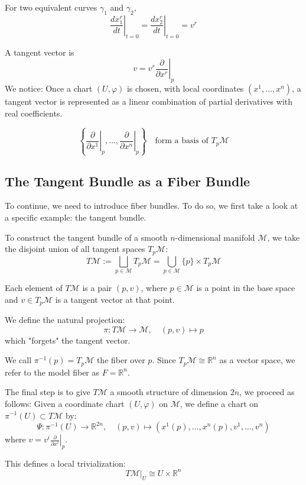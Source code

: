 For two equivalent curves $\gamma_1$ and $\gamma_2$,
\[
\left. \frac{d x_1^r}{dt} \right|_{t=0}
= \left. \frac{d x_2^r}{dt} \right|_{t=0}
= v^r
\]

A tangent vector is
\[
v = v^r \left. \frac{\partial}{\partial x^r} \right|_p
\]
We notice: Once a chart $(U, \varphi)$ is chosen, with local coordinates $(x^1, \dots, x^n)$, a tangent vector is represented as a linear combination of partial derivatives with real coefficients.

\[
\left\{ \left. \frac{\partial}{\partial x^1} \right|_p, \dots, \left. \frac{\partial}{\partial x^n} \right|_p \right\} \quad \text{form a basis of } T_p \mathcal{M}
\]



\subsection*{The Tangent Bundle as a Fiber Bundle}

To continue, we need to introduce fiber bundles. To do so, we first take a look at a specific example: the tangent bundle.

To construct the tangent bundle of a smooth $n$-dimensional manifold $\mathcal{M}$, we take the disjoint union of all tangent spaces $T_p\mathcal{M}$:
\[
T\mathcal{M} := \bigsqcup_{p \in \mathcal{M}} T_p\mathcal{M}
= \bigcup_{p \in \mathcal{M}} \{p\} \times T_p\mathcal{M}
\]

Each element of $T\mathcal{M}$ is a pair $(p, v)$, where $p \in \mathcal{M}$ is a point in the base space and $v \in T_p\mathcal{M}$ is a tangent vector at that point.

We define the natural projection:
\[
\pi: T\mathcal{M} \to \mathcal{M}, \quad (p, v) \mapsto p
\]
which "forgets" the tangent vector.

We call $\pi^{-1}(p) = T_p\mathcal{M}$ the fiber over $p$. Since $T_p\mathcal{M} \cong \mathbb{R}^n$ as a vector space, we refer to the model fiber as $F = \mathbb{R}^n$.

The final step is to give $T\mathcal{M}$ a smooth structure of dimension $2n$, we proceed as follows:  
Given a coordinate chart $(U, \varphi)$ on $\mathcal{M}$, we define a chart on $\pi^{-1}(U) \subset T\mathcal{M}$ by:
\[
\Psi: \pi^{-1}(U) \to \mathbb{R}^{2n}, \quad (p, v) \mapsto \left(x^1(p), \dots, x^n(p), v^1, \dots, v^n \right)
\]
where $v = v^i \left. \frac{\partial}{\partial x^i} \right|_p$.

This defines a local trivialization:
\[
T\mathcal{M}|_U \cong U \times \mathbb{R}^n
\]

